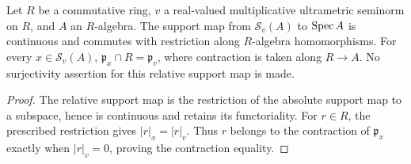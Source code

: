 \begin{lemma}
\label{spectrum:relative-support}
\leanok
{}
Let $R$ be a commutative ring, $v$ a real-valued multiplicative ultrametric seminorm
on $R$, and $A$ an $R$-algebra. The support map from $\mathcal S_v(A)$ to $\operatorname{Spec} A$
is continuous and commutes with restriction along $R$-algebra homomorphisms.
For every $x\in\mathcal S_v(A)$,
$\mathfrak p_x\cap R=\mathfrak p_v$, where contraction is taken along $R\to A$.
No surjectivity assertion for this relative support map is made.
\end{lemma}
\begin{proof}
The relative support map is the restriction of the absolute support map to a
subspace, hence is continuous and retains its functoriality. For $r\in R$,
the prescribed restriction gives $|r|_x=|r|_v$. Thus $r$ belongs to the contraction
of $\mathfrak p_x$ exactly when $|r|_v=0$, proving the contraction equality.
\end{proof}
